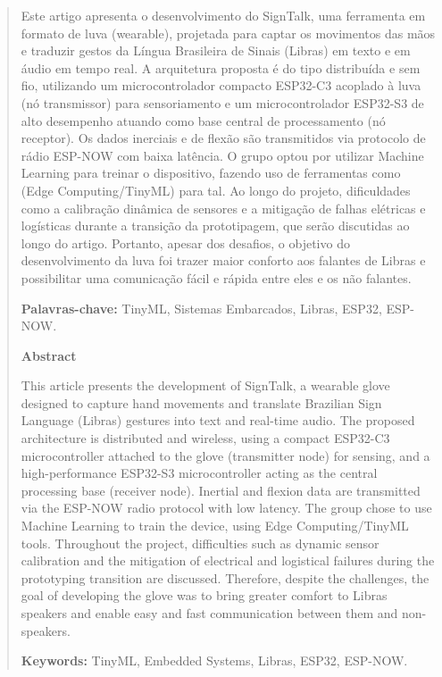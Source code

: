 \documentclass[12pt,a4paper]{article}
\begin{document}
\begin{abstract}
\noindent Este artigo apresenta o desenvolvimento do SignTalk, uma ferramenta em formato de luva (wearable), projetada para captar os movimentos das mãos e traduzir gestos da Língua Brasileira de Sinais (Libras) em texto e em áudio em tempo real. A arquitetura proposta é do tipo distribuída e sem fio, utilizando um microcontrolador compacto ESP32-C3 acoplado à luva (nó transmissor) para sensoriamento e um microcontrolador ESP32-S3 de alto desempenho atuando como base central de processamento (nó receptor). Os dados inerciais e de flexão são transmitidos via protocolo de rádio ESP-NOW com baixa latência. O grupo optou por utilizar Machine Learning para treinar o dispositivo, fazendo uso de ferramentas como (Edge Computing/TinyML) para tal. Ao longo do projeto, dificuldades como a calibração dinâmica de sensores e a mitigação de falhas elétricas e logísticas durante a transição da prototipagem, que serão discutidas ao longo do artigo. Portanto, apesar dos desafios, o objetivo do desenvolvimento da luva foi trazer maior conforto aos falantes de Libras e possibilitar uma comunicação fácil e rápida entre eles e os não falantes.

\vspace{1em}
\noindent\textbf{Palavras-chave:} TinyML, Sistemas Embarcados, Libras, ESP32, ESP-NOW.

\vspace{2em}
\begin{center}
    \textbf{Abstract}
\end{center}
\noindent This article presents the development of SignTalk, a wearable glove designed to capture hand movements and translate Brazilian Sign Language (Libras) gestures into text and real-time audio. The proposed architecture is distributed and wireless, using a compact ESP32-C3 microcontroller attached to the glove (transmitter node) for sensing, and a high-performance ESP32-S3 microcontroller acting as the central processing base (receiver node). Inertial and flexion data are transmitted via the ESP-NOW radio protocol with low latency. The group chose to use Machine Learning to train the device, using Edge Computing/TinyML tools. Throughout the project, difficulties such as dynamic sensor calibration and the mitigation of electrical and logistical failures during the prototyping transition are discussed. Therefore, despite the challenges, the goal of developing the glove was to bring greater comfort to Libras speakers and enable easy and fast communication between them and non-speakers.

\vspace{1em}
\noindent\textbf{Keywords:} TinyML, Embedded Systems, Libras, ESP32, ESP-NOW.
\end{abstract}
\end{document}
